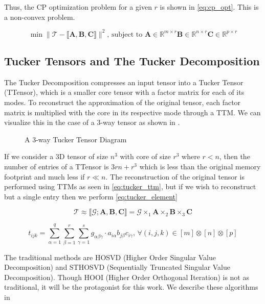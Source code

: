    Thus, the CP optimization problem for a given $r$ is shown in
    \ref{eq:cp_opt}. This is a non-convex problem. 

    \begin{equation} \label{eq:cp_opt}
        \min \|\mathcal{T} - \llbracket \mathbf{A, B, C} \rrbracket \|^2 \text{, subject to } \mathbf{A} \in \mathbb{R}^{m\times r} \mathbf{B} \in \mathbb{R}^{n\times r} \mathbf{C} \in \mathbb{R}^{p\times r}
    \end{equation}
        




\subsection{Tucker Tensors and The Tucker Decomposition} \label{sec:Tucker Tensors and The Tucker Decomposition}
    The Tucker Decomposition compresses an input tensor into a Tucker Tensor
    (TTensor), which is a smaller core tensor with a factor matrix for each of
    its modes. To reconstruct the approximation of the original tensor, each
    factor matrix is multiplied with the core in its respective mode through a
    TTM. We can visualize this in the case of a 3-way tensor as shown in
    .

    \begin{figure}[ht]
        \centering
        
        \caption[A 3-way Tucker Tensor Diagram]{A 3-way Tucker Tensor Diagram}
        \label{fig:TTensor}
    \end{figure}

    If we consider a 3D tensor of size $n^3$ with core of size $r^3$ where $r <
    n$, then the number of entries of a TTensor is $3rn + r^3$ which is less
    than the original memory footprint and much less if $r \ll n$. The
    reconstruction of the original tensor is performed using TTMs as seen in
    \ref{eq:tucker_ttm}, but if we wish to reconstruct but a single entry then
    we perform \ref{eq:tucker_element}

    \begin{equation} \label{eq:tucker_ttm}
        \mathcal{T} \approx \llbracket \mathcal{G}; \mathbf{A,B,C} \rrbracket = \mathcal{G} \times_1 \mathbf{A} \times_2 \mathbf{B} \times_3 \mathbf{C}
    \end{equation}
    
    \begin{equation} \label{eq:tucker_element}
        t_{ijk} = \sum_{\alpha = 1}^{q} \sum_{\beta = 1}^{r} \sum_{\gamma = 1}^{s} g_{\alpha \beta \gamma}\cdot a_{i\alpha}b_{j\beta}c_{i\gamma}\text{, }\forall (i, j, k) \in [m]\otimes[n]\otimes[p]
    \end{equation}
    
    
    The traditional methods are HOSVD (Higher Order Singular Value
    Decomposition) and STHOSVD (Sequentially Truncated Singular Value
    Decomposition). Though HOOI (Higher Order Orthogonal Iteration) is not as
    traditional, it will be the protagonist for this work. We describe these
    algorithms in 
